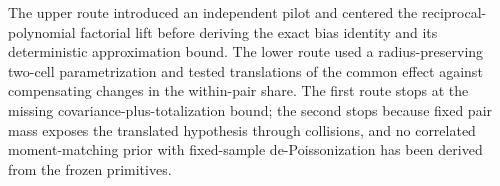 The upper route introduced an independent pilot and centered the reciprocal-polynomial factorial lift before deriving the exact bias identity and its deterministic approximation bound.  The lower route used a radius-preserving two-cell parametrization and tested translations of the common effect against compensating changes in the within-pair share.  The first route stops at the missing covariance-plus-totalization bound; the second stops because fixed pair mass exposes the translated hypothesis through collisions, and no correlated moment-matching prior with fixed-sample de-Poissonization has been derived from the frozen primitives.